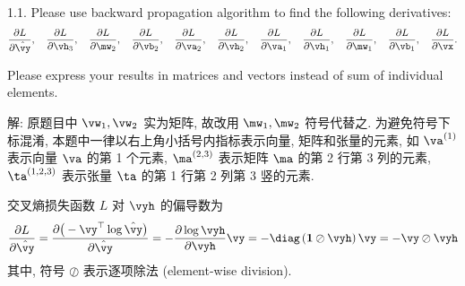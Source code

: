 \documentclass[openany]{ctexbook}
\theoremstyle{kaiti}
\theoremstyle{normal}
\begin{document}
1.1. Please use backward propagation algorithm to find the following derivatives:
\begin{equation}
  \frac{\partial L}{\partial \hat{\vy}},\quad\frac{\partial L}{\partial \vh_3},\quad\frac{\partial L}{\partial \mw_2},\quad\frac{\partial L}{\partial \vb_2},\quad\frac{\partial L}{\partial \va_2},\quad\frac{\partial L}{\partial \vh_2},\quad\frac{\partial L}{\partial \va_1},\quad\frac{\partial L}{\partial \vh_1},\quad\frac{\partial L}{\partial \mw_1},\quad\frac{\partial L}{\partial \vb_1},\quad\frac{\partial L}{\partial \vx}.
\end{equation}

Please express your results in matrices and vectors instead of sum of individual elements.

解: 原题目中 $\vw_1,\vw_2$ 实为矩阵, 故改用 $\mw_1,\mw_2$ 符号代替之. 为避免符号下标混淆, 本题中一律以右上角小括号内指标表示向量, 矩阵和张量的元素, 如 $\va^{(1)}$ 表示向量 $\va$ 的第 1 个元素, $\ma^{(2,3)}$ 表示矩阵 $\ma$ 的第 2 行第 3 列的元素, $\ta^{(1,2,3)}$ 表示张量 $\ta$ 的第 1 行第 2 列第 3 竖的元素.

交叉熵损失函数 $L$ 对 $\vyh$ 的偏导数为
\begin{equation}
  \begin{aligned}
    \frac{\partial L}{\partial \hat{\vy}}
    =\frac{\partial\big(-\vy^\top\log\hat{\vy}\big)}{\partial \hat{\vy}}
    =-\frac{\partial\log\vyh}{\partial\vyh}\vy
    =-\diag\left(\bm{1}\oslash\vyh\right)\vy
    =-\vy\oslash\vyh
  \end{aligned}
\end{equation}
其中, 符号 $\oslash$ 表示逐项除法 (element-wise division).
\end{document}
